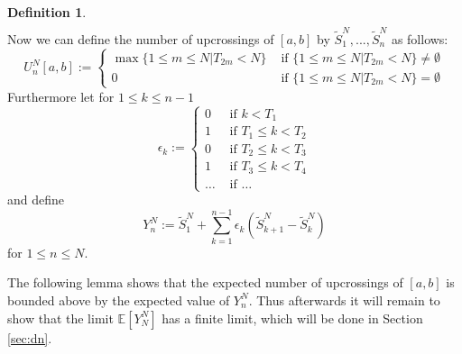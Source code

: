 \documentclass[phd]{UWMThesis}
\newcommand{\E}{\mathbb{E}}
\newcommand{\StN}[1]{\tilde{S}_{#1}^N}
\newcommand{\YN}[1]{Y_{#1}^N}
\newcommand{\UNab}[1]{U_{#1}^N[a,b]}
\renewcommand{\.}{\textrm{ .}}
\theoremstyle{definition}
\newtheorem{defn}[thm]{Definition}
\numberwithin{thm}{chapter}
\begin{document}
\begin{defn}
\begin{align*}
	\end{align*}
	Now we can define the number of upcrossings of $[a, b]$ by $\StN{1}, ..., \StN{n}$ as follows:
	\[
	\UNab{n} :=\begin{cases}  
	\max\{1\leq m \leq N | T_{2m} < N\} & \textrm{ if } \{1\leq m \leq N | T_{2m} < N\}\neq \emptyset\\
	0 &  \textrm{ if } \{1\leq m \leq N | T_{2m} < N\} = \emptyset
	\end{cases}
	\]
	Furthermore let for $1\leq k\leq n-1$
	\[ \epsilon_k := \begin{cases} 
	0 & \textrm{ if } k < T_1 \\
	1 & \textrm{ if } T_1 \leq k < T_2\\
	0 & \textrm{ if } T_2 \leq k < T_3\\
	1 & \textrm{ if } T_3 \leq k < T_4\\
	\dots & \textrm{ if } \dots
	\end{cases}
	\]
	and define
	$$\YN{n} := \StN{1} + \sum\limits_{k=1}^{n-1} \epsilon_k (\StN{k+1}-\StN{k})$$
	for $1\leq n\leq N$. 	
\end{defn}
%
The following lemma shows that the expected number of upcrossings of $[a,b]$ is bounded above by the expected value of $Y_n^N$. Thus afterwards it will remain to show that the limit $\E[Y_N^N]$ has a finite limit, which will be done in Section \ref{sec:dn}.
\end{document}

